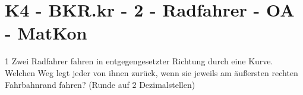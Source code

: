 \section{K4 - BKR.kr - 2 - Radfahrer - OA - MatKon}

\begin{langesbeispiel} \item[1] %
Zwei Radfahrer fahren in entgegengesetzter Richtung durch eine Kurve. Welchen Weg legt jeder von ihnen zurück, wenn sie jeweils am äußersten rechten Fahrbahnrand fahren? (Runde auf 2 Dezimalstellen)
				\begin{center}
				\end{center}
				
\end{langesbeispiel}